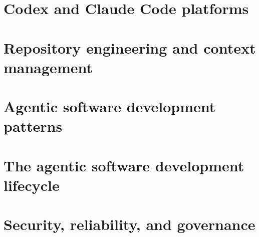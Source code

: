 \documentclass[11pt,oneside,openany]{book}
\begin{document}
\part{Codex and Claude Code platforms}







\part{Repository engineering and context management}











\part{Agentic software development patterns}







\part{The agentic software development lifecycle}













\part{Security, reliability, and governance}






\end{document}
